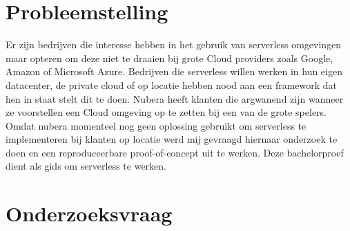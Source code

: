
\section{Probleemstelling}
\label{sec:probleemstelling}


Er zijn bedrijven die interesse hebben in het gebruik van serverless omgevingen maar opteren om deze niet te draaien bij grote Cloud providers zoals Google, Amazon of Microsoft Azure. Bedrijven die serverless willen werken in hun eigen datacenter, de private cloud of op locatie hebben nood aan een framework dat hen in staat stelt dit te doen. Nubera heeft klanten die argwanend zijn wanneer ze voorstellen een Cloud omgeving op te zetten bij een van de grote spelers. Omdat nubera momenteel nog geen oplossing gebruikt om serverless te implementeren bij klanten op locatie werd mij gevraagd hiernaar onderzoek te doen en een reproduceerbare proof-of-concept uit te werken. Deze bachelorproef dient als gids om serverless te werken.

\section{Onderzoeksvraag}
\label{sec:onderzoeksvraag}


